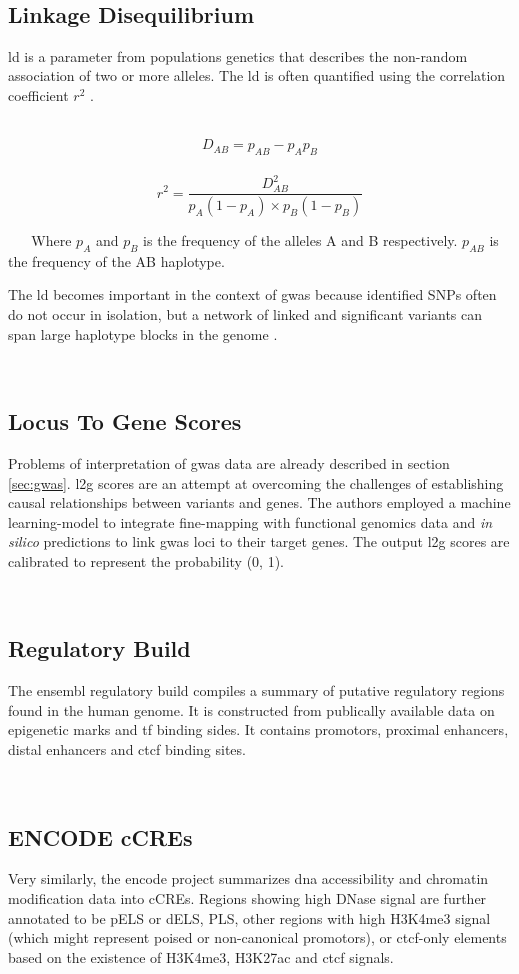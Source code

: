     \subsection{Linkage Disequilibrium}
    \label{subsec:ld}
    \Ac{ld} is a parameter from populations genetics that describes the non-random association of two or more alleles. The \ac{ld} is often quantified using the correlation coefficient $r^2$ \cite{slatkinLinkageDisequilibriumUnderstanding2008}.

        $$ D_{AB} = p_{AB} − p_A p_B $$
        $$ r^2 = \frac{D_{AB}^2}{p_A (1-p_A) \times p_B (1-p_B)} $$

    Where $p_A$ and $p_B$ is the frequency of the alleles A and B respectively. $p_{AB}$ is the frequency of the AB haplotype.

    The \ac{ld} becomes important in the context of \ac{gwas} because identified SNPs often do not occur in isolation, but a network of linked and significant variants can span large haplotype blocks in the genome \cite{slatkinLinkageDisequilibriumUnderstanding2008}.

    \subsection{Locus To Gene Scores}
    Problems of interpretation of \ac{gwas} data are already described in section \ref{sec:gwas}. \ac{l2g} scores are an attempt at overcoming the challenges of establishing causal relationships between variants and genes. The authors employed a machine learning-model to integrate fine-mapping with functional genomics data and \textit{in silico} predictions to link \ac{gwas} loci to their target genes. The output \ac{l2g} scores are calibrated to represent the probability (0, 1). \cite{mountjoyOpenApproachSystematically2021}

    \subsection{Regulatory Build}
    The ensembl regulatory build compiles a summary of putative regulatory regions found in the human genome. It is constructed from publically available data on epigenetic marks and \ac{tf} binding sides. It contains promotors, proximal enhancers, distal enhancers and \ac{ctcf} binding sites. \cite{zerbinoEnsemblRegulatoryBuild2015}

    \subsection{ENCODE \acp{cCRE}}
    Very similarly, the \ac{encode} project summarizes \ac{dna} accessibility and chromatin modification data into \acp{cCRE}. Regions showing high DNase signal are further annotated to be \ac{pELS} or \ac{dELS}, \ac{PLS}, other regions with high \ac{H3K4me3} signal (which might represent poised or non-canonical promotors), or \ac{ctcf}-only elements based on the existence of \ac{H3K4me3}, \ac{H3K27ac} and \ac{ctcf} signals.
    \cite{mooreExpandedEncyclopaediasDNA2020}

